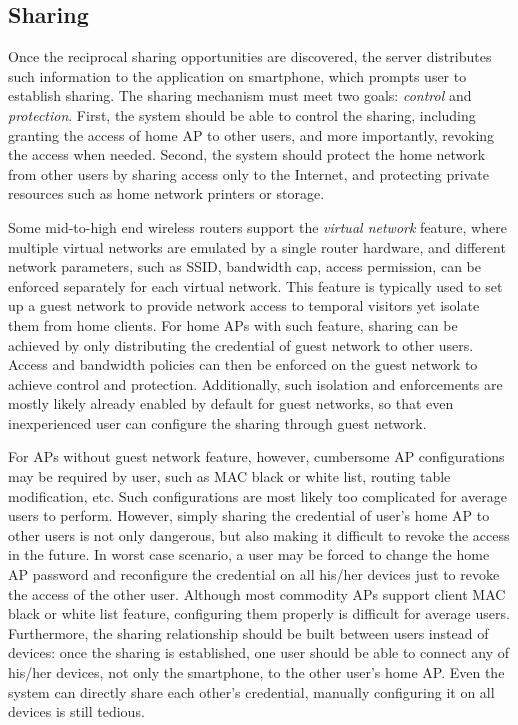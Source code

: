 \subsection{Sharing}
\label{subsec:sharing}

Once the reciprocal sharing opportunities are discovered, the \wisefi{} server
distributes such information to the \wisefi{} application on smartphone, which
prompts user to establish \wifi{} sharing. The sharing mechanism must meet two
goals: \textit{control} and \textit{protection}. First, the system should be
able to control the sharing, including granting the access of home AP to other
\wisefi{} users, and more importantly, revoking the access when needed. Second,
the system should protect the home network from other \wisefi{} users by sharing
access only to the Internet, and protecting private resources such as home
network printers or storage.

Some mid-to-high end wireless routers support the \textit{virtual network}
feature, where multiple virtual \wifi{} networks are emulated by a single router
hardware, and different network parameters, such as SSID, bandwidth cap, access
permission, can be enforced separately for each virtual network. This feature is
typically used to set up a guest \wifi{} network to provide network access to
temporal visitors yet isolate them from home clients. For home APs with such
feature, \wifi{} sharing can be achieved by only distributing the credential of
guest network to other \wisefi{} users. Access and bandwidth policies can then
be enforced on the guest network to achieve control and protection.
Additionally, such isolation and enforcements are mostly likely already enabled
by default for guest networks, so that even inexperienced user can configure the
\wifi{} sharing through guest network.

For APs without guest network feature, however, cumbersome AP configurations may
be required by user, such as MAC black or white list, routing table
modification, etc. Such configurations are most likely too complicated for
average users to perform. However, simply sharing the \wifi{} credential of user's
home AP to other \wisefi{} users is not only dangerous, but also making it
difficult to revoke the access in the future. In worst case scenario, a user may
be forced to change the home AP password and reconfigure the \wifi{} credential
on all his/her devices just to revoke the access of the other \wisefi{} user.
Although most commodity APs support client MAC black or white list feature,
configuring them properly is difficult for average users. Furthermore, the
sharing relationship should be built between users instead of devices: once the
sharing is established, one user should be able to connect any of his/her
devices, not only the smartphone, to the other user's home AP. Even the system
can directly share each other's \wifi{} credential, manually configuring it on
all devices is still tedious.

